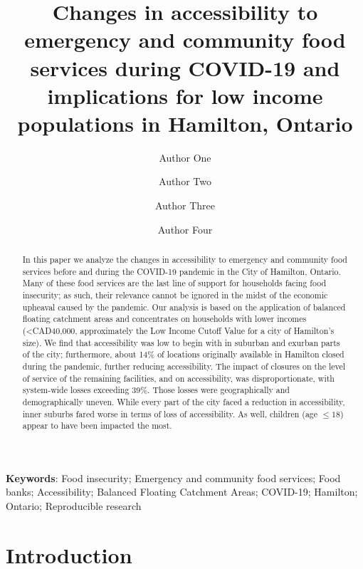 \documentclass[]{elsarticle} %
\begin{document}
\begin{frontmatter}

  \title{Changes in accessibility to emergency and community food
services during COVID-19 and implications for low income populations in
Hamilton, Ontario}
    \author[Some University]{Author One}
    \author[Another University]{Author Two}
    \author[Some University]{Author Three}
    \author[Some University]{Author Four}
      \address[Some University]{Department, Street, City, State, Zip}
    \address[Another University]{Department, Street, City, State, Zip}
  
  \begin{abstract}
  In this paper we analyze the changes in accessibility to emergency and
  community food services before and during the COVID-19 pandemic in the
  City of Hamilton, Ontario. Many of these food services are the last
  line of support for households facing food insecurity; as such, their
  relevance cannot be ignored in the midst of the economic upheaval
  caused by the pandemic. Our analysis is based on the application of
  balanced floating catchment areas and concentrates on households with
  lower incomes (\textless CAD40,000, approximately the Low Income
  Cutoff Value for a city of Hamilton's size). We find that
  accessibility was low to begin with in suburban and exurban parts of
  the city; furthermore, about 14\% of locations originally available in
  Hamilton closed during the pandemic, further reducing accessibility.
  The impact of closures on the level of service of the remaining
  facilities, and on accessibility, was disproportionate, with
  system-wide losses exceeding 39\%. Those losses were geographically
  and demographically uneven. While every part of the city faced a
  reduction in accessibility, inner suburbs fared worse in terms of loss
  of accessibility. As well, children (age \(\le 18\)) appear to have
  been impacted the most.
  \end{abstract}
  
 \end{frontmatter}

\textbf{Keywords}: Food insecurity; Emergency and community food
services; Food banks; Accessibility; Balanced Floating Catchment Areas;
COVID-19; Hamilton; Ontario; Reproducible research

\newpage

\hypertarget{introduction}{%
\section{Introduction}\label{introduction}}
\end{document}
